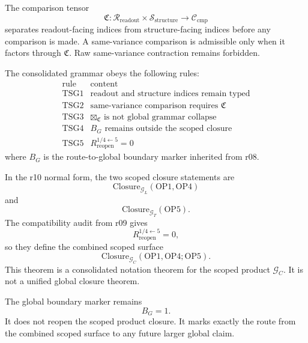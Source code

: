 \begin{definition}
The comparison tensor
\[
    \mathfrak C:
    \mathcal R_{\mathrm{readout}}
    \times
    \mathcal S_{\mathrm{structure}}
    \longrightarrow
    \mathcal C_{\mathrm{cmp}}
\]
separates readout-facing indices from structure-facing indices before any
comparison is made.  A same-variance comparison is admissible only when it
factors through \(\mathfrak C\).  Raw same-variance contraction remains
forbidden.
\end{definition}

\begin{proposition}
The consolidated grammar obeys the following rules:
\[
\begin{array}{c|l}
\text{rule} & \text{content}\\
\hline
\mathrm{TSG1} & \text{readout and structure indices remain typed}\\
\mathrm{TSG2} & \text{same-variance comparison requires }\mathfrak C\\
\mathrm{TSG3} & \boxtimes_{\mathfrak C}\text{ is not global grammar collapse}\\
\mathrm{TSG4} & B_G\text{ remains outside the scoped closure}\\
\mathrm{TSG5} & R_{\mathrm{reopen}}^{1/4\leftarrow 5}=0
\end{array}
\]
where \(B_G\) is the route-to-global boundary marker inherited from r08.
\end{proposition}

\begin{theorem}
In the r10 normal form, the two scoped closure statements are
\[
    \mathrm{Closure}_{\mathcal G_L}(\mathrm{OP1},\mathrm{OP4})
\]
and
\[
    \mathrm{Closure}_{\mathcal G_T}(\mathrm{OP5}).
\]
The compatibility audit from r09 gives
\[
    R_{\mathrm{reopen}}^{1/4\leftarrow 5}=0,
\]
so they define the combined scoped surface
\[
    \mathrm{Closure}_{\mathcal G_C}(\mathrm{OP1},\mathrm{OP4};\mathrm{OP5}).
\]
This theorem is a consolidated notation theorem for the scoped product
\(\mathcal G_C\).  It is not a unified global closure theorem.
\end{theorem}

\begin{remark}
The global boundary marker remains
\[
    B_G = 1.
\]
It does not reopen the scoped product closure.  It marks exactly the route
from the combined scoped surface to any future larger global claim.
\end{remark}


